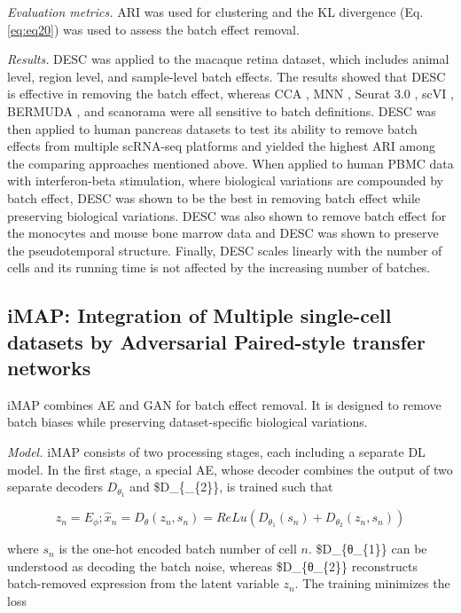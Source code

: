 \documentclass[
]{book}
\begin{document}
\emph{Evaluation metrics.} ARI was used for clustering and the KL divergence (Eq. \eqref{eq:eq20}) was used to assess the batch effect removal.

\emph{Results.} DESC was applied to the macaque retina dataset, which includes animal level, region level, and sample-level batch effects. The results showed that DESC is effective in removing the batch effect, whereas CCA \citep{RN79}, MNN \citep{RN84}, Seurat 3.0 \citep{RN96}, scVI \citep{RN88}, BERMUDA \citep{RN183}, and scanorama \citep{RN121} were all sensitive to batch definitions. DESC was then applied to human pancreas datasets to test its ability to remove batch effects from multiple scRNA-seq platforms and yielded the highest ARI among the comparing approaches mentioned above. When applied to human PBMC data with interferon-beta stimulation, where biological variations are compounded by batch effect, DESC was shown to be the best in removing batch effect while preserving biological variations. DESC was also shown to remove batch effect for the monocytes and mouse bone marrow data and DESC was shown to preserve the pseudotemporal structure. Finally, DESC scales linearly with the number of cells and its running time is not affected by the increasing number of batches.

\hypertarget{ch-5-2-3}{%
\subsection{iMAP: Integration of Multiple single-cell datasets by Adversarial Paired-style transfer networks}\label{ch-5-2-3}}

iMAP \citep{RN123} combines AE and GAN for batch effect removal. It is designed to remove batch biases while preserving dataset-specific biological variations.

\emph{Model.} iMAP consists of two processing stages, each including a separate DL model. In the first stage, a special AE, whose decoder combines the output of two separate decoders \(D_{\theta_{1}}\) and \$D\_\{\theta\_\{2\}\}, is trained such that

\begin{equation}
z_{n} = E_{\phi}; \hat{x}_{n}=D_{\theta}(z_{n},s_{n}) = ReLu(D_{\theta_{1}}(s_{n}) + D_{\theta_{2}}(z_{n}, s_{n})) \label{eq:eq23}
\end{equation}

where \(s_{n}\) is the one-hot encoded batch number of cell \(n\). \$D\_\{θ\_\{1\}\} can be understood as decoding the batch noise, whereas \$D\_\{θ\_\{2\}\} reconstructs batch-removed expression from the latent variable \(z_{n}\). The training minimizes the loss
\end{document}
